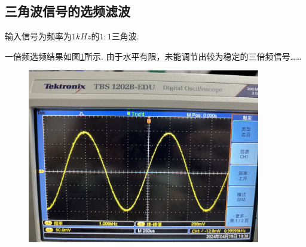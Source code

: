 \documentclass[12pt, a4paper]{ctexart}
\begin{document}
\subsection{三角波信号的选频滤波}
输入信号为频率为$1kHz$的$1:1$三角波.

一倍频选频结果如图\ref{fig5}所示.
由于水平有限，未能调节出较为稳定的三倍频信号……
\begin{figure}[htbp]
  \centering
  \includegraphics[width=4in]{figure/tri-1kHz.jpg}
  \caption{}
  \label{fig5}
\end{figure}
\end{document}
